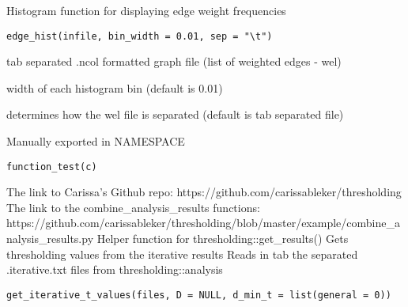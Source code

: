 \documentclass[a4paper]{book}
\begin{document}
%
\begin{Description}
Histogram function for displaying edge weight frequencies
\end{Description}
%
\begin{Usage}
\begin{verbatim}
edge_hist(infile, bin_width = 0.01, sep = "\t")
\end{verbatim}
\end{Usage}
%
\begin{Arguments}
\begin{ldescription}
\item[\code{infile}] tab separated .ncol formatted graph file (list of weighted edges - wel)

\item[\code{bin\_width}] width of each histogram bin (default is 0.01)

\item[\code{sep}] determines how the wel file is separated (default is tab separated file)
\end{ldescription}
\end{Arguments}
%
\begin{Description}
Manually exported in NAMESPACE
\end{Description}
%
\begin{Usage}
\begin{verbatim}
function_test(c)
\end{verbatim}
\end{Usage}
%
\begin{Description}
The link to Carissa's Github repo: 
https://github.com/carissableker/thresholding
The link to the combine\_analysis\_results functions: 
https://github.com/carissableker/thresholding/blob/master/example/combine\_analysis\_results.py
Helper function for thresholding::get\_results()
Gets thresholding values from the iterative results
Reads in tab the separated .iterative.txt files from 
thresholding::analysis
\end{Description}
%
\begin{Usage}
\begin{verbatim}
get_iterative_t_values(files, D = NULL, d_min_t = list(general = 0))
\end{verbatim}
\end{Usage}
\end{document}
